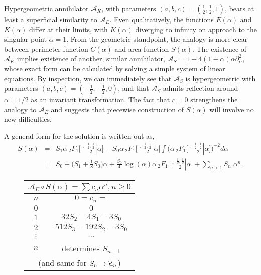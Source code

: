\documentclass[nofootinbib,preprint]{revtex4-1}
\newcommand{\tFo}[3]{\,_2F_1 \bigg[ 
\genfrac.|{0pt}{}{#1}{#2} #3 \bigg]}
\newcommand{\rev}[1]{\text{\reflectbox{$#1$}}}
\begin{document}
Hypergeometric annihilator $\mathcal{A}_K$, with parameters $(a,b,c)=(\frac{1}{2},\frac{1}{2},1)$,
bears at least a superficial similarity to $\mathcal{A}_E$. Even qualitatively, the functions 
$E(\alpha)$ and $K(\alpha)$ differ at their limits, with $K(\alpha)$ diverging to infinity on 
approach to the singular point $\alpha=1$. From the geometric standpoint, the analogy is more 
clear between perimeter function $C(\alpha)$ and area function $S(\alpha)$. The existence of 
$\mathcal{A}_K$ implies existence of another, similar annihilator, 
$\mathcal{A}_S= 1 -4(1-\alpha)\alpha \partial_{\alpha}^2$, whose exact form can be calculated by 
solving a simple system of linear equations. By inspection, we can immediately see that $\mathcal{A}_S$
is hypergeometric with parameters ${(a,b,c)=(-\frac{1}{2},-\frac{1}{2},0)}$, and that $\mathcal{A}_S$
admits reflection around $\alpha = 1/2$ as an invariant transformation. The fact that $c=0$ strengthens
the analogy to $\mathcal{A}_E$ and suggests that piecewise construction of $S(\alpha)$ will involve no 
new difficulties.


A general form for the solution is written out as,
\begin{eqnarray}
S(\alpha) &=& S_1 \alpha \tFo{\frac{1}{2},\frac{1}{2}}{2}{\alpha}
- S_0 \alpha \tFo{\frac{1}{2},\frac{1}{2}}{2}{\alpha}
\int  \bigg(\alpha \tFo{\frac{1}{2},\frac{1}{2}}{2}{\alpha}\bigg)^{-2}d\alpha  \nonumber \\
 &=& S_0 
+ \bigg(S_1+\frac{1}{8}S_0\bigg) \alpha 
+\frac{S_0}{4}\log(\alpha) \alpha 
\tFo{\frac{1}{2},\frac{1}{2}}{2}{\alpha}
+ \sum_{n>1}S_n\;\alpha^n. \nonumber  
\end{eqnarray}

\begin{wrapfigure}{R}{7cm}
\begin{center}
\begin{tabular}{ c | c }
\hline \hline
\multicolumn{2}{c}{
\;\;\;$\mathcal{A}_E \circ S(\alpha)
= \sum c_n \alpha^n, n\ge 0$\;\;\; } \\
\hline 
$\;\;n\;\;$& $0=c_n=$ \\
\hline
$0$ & $0$  \\
$1$ & $32 S_2-4 S_1-3 S_0$  \\
$2$ & $512 S_3-192 S_2-3 S_0$  \\
$\vdots$ & $\hdots$  \\
$n$ & determines $S_{n+1}$ \\
\multicolumn{2}{c}{(and same for $S_n \rightarrow \rev{S}_n$) }
\label{tab:ConsS}
\end{tabular}
\end{center}
\end{wrapfigure}
\end{document}
